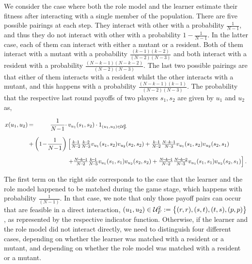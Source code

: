 \documentclass[11pt]{article}
\newcommand{\splitatcommas}[1]{%
  \begingroup
  \begingroup\lccode`~=`, \lowercase{\endgroup \edef~{\mathchar\the\mathcode`,
    \penalty0 \noexpand\hspace{0pt plus 1em}}%
  }\mathcode`,="8000 #1%
  \endgroup
}
\theoremstyle{plainCl1}
\theoremstyle{plainCl2}
\begin{document}
We consider the case where both the role model and the learner estimate their
fitness after interacting with a single member of the population. There are five
possible pairings at each step. They interact with other with a probability
\(\frac{1}{N - 1}\), and thus they do not interact with other with a probability
\(1 - \frac{1}{N - 1}\). In the latter case, each of them can interact with
either a mutant or a resident. Both of them interact with a mutant with a
probability $\frac{(k-1)(k-2)}{(N-2)(N-3)}$ and both interact with a resident
with a probability $\frac{(N-k-1)(N-k-2)}{(N-2)(N-3)}$. The last two possible
pairings are that either of them interacts with a resident whilst the other
interacts with a mutant, and this happens with a probability
$\frac{(N-k-1)(k-1)}{(N-2)(N-3)}$. The probability that the respective last
round payoffs of two players \(s_1, s_2\) are given by $u_1$ and $u_2$ as,

\begin{equation}\label{eq:Chi}
\setlength{\arraycolsep}{1pt}
\begin{array}{llrl}
x(u_1,u_2)	 &=&\displaystyle \frac{1}{N\!-\!1}\cdot  &v_{u_1}(s_1,s_2)\cdot 1_{(u_1,u_2)\in \mathcal{U}^2_F}\\[0.5cm]
&+	
&\displaystyle \left(1\!-\!\frac{1}{N\!-\!1}\right)  
&\left[ \frac{k\!-\!1}{N\!-\!2}\frac{k\!-\!2}{N\!-\!3} v_{u_1}(s_1,s_2) v_{u_2}(s_2,s_2) + 
 \frac{k\!-\!1}{N\!-\!2}\frac{N\!-\!k\!-\!1}{N\!-\!3} v_{u_1}(s_1,s_2) v_{u_2}(s_2,s_1)\right.\\[0.5cm]
&&&\left. +\frac{N\!-\!k\!-\!1}{N\!-\!2}\frac{k\!-\!1}{N\!-\!3} v_{u_1}(s_1,s_1) v_{u_2}(s_2,s_2) + 
 \frac{N\!-\!k\!-\!1}{N\!-\!2}\frac{N\!-\!k\!-\!2}{N\!-\!3} v_{u_1}(s_1,s_1) v_{u_2}(s_2,s_1)\right].
\end{array}
\end{equation}

The first term on the right side corresponds to the case that the learner and
the role model happened to be matched during the game stage, which happens with
probability $\frac{1}{(N\!-\!1)}$. In that case, we note that only those payoff
pairs can occur that are feasible in a direct interaction,
$\splitatcommas{(u_1,u_2)\in \mathcal{U}^2_F:=\big\{ (r, r), (s, t), (t, s), (p, p)
\big\}}$, as represented by the respective indicator function. Otherwise, if the
learner and the role model did not interact directly, we need to distinguish
four different cases, depending on whether the learner was matched with a
resident or a mutant, and depending on whether the role model was matched with a
resident or a mutant.
\end{document}
